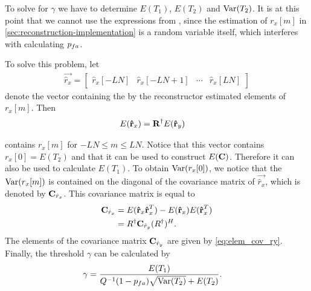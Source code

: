 \documentclass[a4paper, openany, oneside]{memoir}
\begin{document}
To solve for $\gamma$ we have to determine $E\left(T_1\right)$, $E\left(T_2\right)$ and $\Var(T_2)$. It is at this point that we cannot use the expressions from \cite{zheng2009spectrum}, since the estimation of $r_x[m]$ in \cref{sec:reconstruction-implementation} is a random variable itself, which interferes with calculating $p\ss{fa}$.

To solve this problem, let
\begin{align*}
    \vec{\hat{r}_x} = \begin{bmatrix} \hat{r}_x[-LN]& \hat{r}_x[-LN+1] & \cdots & \hat{r}_x[LN]\end{bmatrix}
\end{align*}
denote the vector containing the by the reconstructor estimated elements of $r_x[m]$. Then 
\begin{align*}
E(\vec{\hat{r}}_x) &= \mat{R}^{\dagger}E(\vec{\hat{r}}_y)
\end{align*}

contains $r_x[m]$ for $-LN \leq m \leq LN$. Notice that this vector contains $r_x[0] = E(T_2)$ and that it can be used to construct $E(\mat{C})$. Therefore it can also be used to calculate $E(T_1)$. To obtain $\Var(r_x[0])$, we notice that the $\Var(r_x[m])$ is contained on the diagonal of the covariance matrix of $\vec{\hat{r}_x}$, which is denoted by $\mat{C}_{\hat{r}_x}$. This covariance matrix is equal to
\begin{align*}
\mat{C}_{\hat{r}_x} &= E(\vec{\hat{r}}_x\vec{\hat{r}}_x^T) - E(\vec{\hat{r}}_x) E(\vec{\hat{r}}_x^T)\\
&= R^{\dagger}\mat{C}_{\hat{r}_y}(R^{\dagger})^H.
\end{align*}
The elements of the covariance matrix $\mat{C}_{\hat{r}_y}$ are given by \cref{eq:elem_cov_ry}. Finally, the threshold $\gamma$ can be calculated by
\begin{align*}
\gamma &= \frac{E(T_1)}{Q^{-1}(1-p_{fa})\sqrt{\Var(T_2)}+E(T_2)}.
\end{align*}
\end{document}
